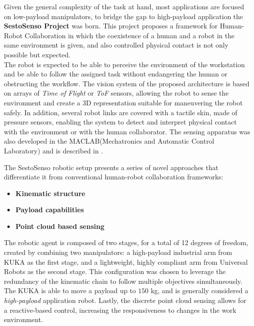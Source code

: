 \noindent Given the general complexity of the task at hand, most applications are focused on low-payload manipulators, to bridge the gap to high-payload application the \textbf{SestoSenso Project} was born. This project proposes a framework for Human-Robot Collaboration in which the coexistence of a human and a robot in the same environment is given, and also controlled physical contact is not only possible but expected.\\
\noindent The robot is expected to be able to perceive the environment of the workstation and be able to follow the assigned task without endangering the human or obstructing the workflow. The vision system of the proposed architecture is based on arrays of \textit{Time of Flight} or \textit{ToF} sensors, allowing the robot to sense the environment and create a 3D representation suitable for maneuvering the robot safely. In addition, several robot links are covered with a tactile skin, made of pressure sensors, enabling the system to detect and interpret physical contact with the environment or with the human collaborator. The sensing apparatus was also developed in the MACLAB(Mechatronics and Automatic Control Laboratory) and is described in \cite{proxySkin_paper}.

\noindent The SestoSenso robotic setup presents a series of novel approaches that differentiate it from conventional human-robot collaboration frameworks:
\begin{itemize}
	\item \textbf{Kinematic structure}
	\item \textbf{Payload capabilities}
	\item \textbf{Point cloud based sensing}
\end{itemize}
\noindent The robotic agent is composed of two stages, for a total of 12 degrees of freedom, created by combining two manipulators: a high-payload industrial arm from KUKA as the first stage, and a lightweight, highly compliant arm from Universal Robots as the second stage. This configuration was chosen to leverage the redundancy of the kinematic chain to follow multiple objectives simultaneously. The KUKA is able to move a payload up to $150$ kg, and is generally considered a \textit{high-payload} application robot. Lastly, the discrete point cloud sensing allows for a reactive-based control, increasing the responsiveness to changes in the work environment.  


